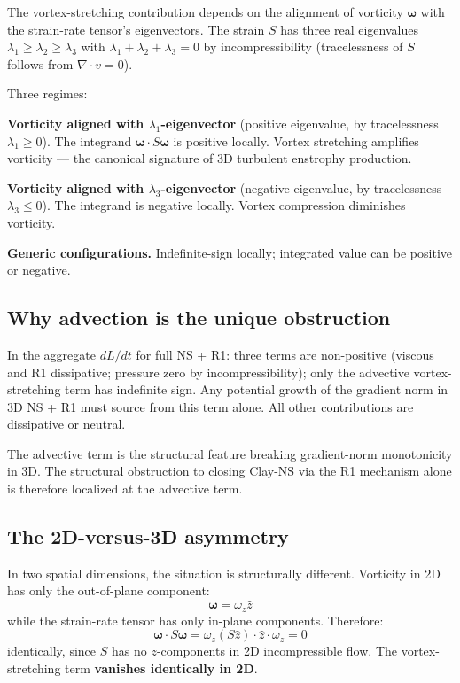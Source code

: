 \documentclass[11pt,a4paper]{article}
\begin{document}
The vortex-stretching contribution depends on the alignment of vorticity $\boldsymbol{\omega}$ with the strain-rate tensor's eigenvectors. The strain $S$ has three real eigenvalues $\lambda_1 \geq \lambda_2 \geq \lambda_3$ with $\lambda_1 + \lambda_2 + \lambda_3 = 0$ by incompressibility (tracelessness of $S$ follows from $\nabla\cdot v = 0$).

Three regimes:

\textbf{Vorticity aligned with $\lambda_1$-eigenvector} (positive eigenvalue, by tracelessness $\lambda_1 \geq 0$). The integrand $\boldsymbol{\omega}\cdot S\boldsymbol{\omega}$ is positive locally. Vortex stretching amplifies vorticity --- the canonical signature of 3D turbulent enstrophy production.

\textbf{Vorticity aligned with $\lambda_3$-eigenvector} (negative eigenvalue, by tracelessness $\lambda_3 \leq 0$). The integrand is negative locally. Vortex compression diminishes vorticity.

\textbf{Generic configurations.} Indefinite-sign locally; integrated value can be positive or negative.

\subsection{Why advection is the unique obstruction}

In the aggregate $dL/dt$ for full NS + R1: three terms are non-positive (viscous and R1 dissipative; pressure zero by incompressibility); only the advective vortex-stretching term has indefinite sign. Any potential growth of the gradient norm in 3D NS + R1 must source from this term alone. All other contributions are dissipative or neutral.

The advective term is the structural feature breaking gradient-norm monotonicity in 3D. The structural obstruction to closing Clay-NS via the R1 mechanism alone is therefore localized at the advective term.

\subsection{The 2D-versus-3D asymmetry}

In two spatial dimensions, the situation is structurally different. Vorticity in 2D has only the out-of-plane component:
\[
\boldsymbol{\omega} = \omega_z\hat z
\]
while the strain-rate tensor has only in-plane components. Therefore:
\[
\boldsymbol{\omega}\cdot S\boldsymbol{\omega} = \omega_z(S\hat z)\cdot\hat z\cdot\omega_z = 0
\]
identically, since $S$ has no $z$-components in 2D incompressible flow. The vortex-stretching term \textbf{vanishes identically in 2D}.
\end{document}
